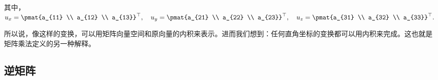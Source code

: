 其中，$u_{x} = \pmat{a_{11} \\ a_{12} \\ a_{13}}^{\top}, \quad u_{y} = \pmat{a_{21} \\ a_{22} \\ a_{23}}^{\top}, \quad u_{z} = \pmat{a_{31} \\ a_{32} \\ a_{33}}^{\top}.$

所以说，像这样的变换，可以用矩阵向量空间和原向量的内积来表示。进而我们想到：任何直角坐标的变换都可以用内积来完成。这也就是矩阵乘法定义的另一种解释。



\subsection{逆矩阵}


